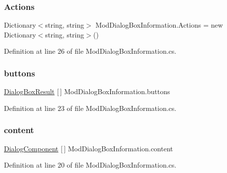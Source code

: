 \subsubsection{\texorpdfstring{Actions}{Actions}}
{\footnotesize\ttfamily Dictionary$<$string, string$>$ Mod\+Dialog\+Box\+Information.\+Actions = new Dictionary$<$string, string$>$()}



Definition at line 26 of file Mod\+Dialog\+Box\+Information.\+cs.

\mbox{\label{class_mod_dialog_box_information_a328073c14bef16ebffc496823d81458f}} 
\subsubsection{\texorpdfstring{buttons}{buttons}}
{\footnotesize\ttfamily \hyperlink{_dialog_box_result_8cs_acd933b66f7b1c8ad36ee61780622c54f}{Dialog\+Box\+Result} \mbox{[}$\,$\mbox{]} Mod\+Dialog\+Box\+Information.\+buttons}



Definition at line 23 of file Mod\+Dialog\+Box\+Information.\+cs.

\mbox{\label{class_mod_dialog_box_information_a02d949373a3b62873905620ad6471cca}} 
\subsubsection{\texorpdfstring{content}{content}}
{\footnotesize\ttfamily \hyperlink{class_dialog_component}{Dialog\+Component} \mbox{[}$\,$\mbox{]} Mod\+Dialog\+Box\+Information.\+content}



Definition at line 20 of file Mod\+Dialog\+Box\+Information.\+cs.

\mbox{\label{class_mod_dialog_box_information_a198407cb46aacda4109948aa548ac6a3}} 
